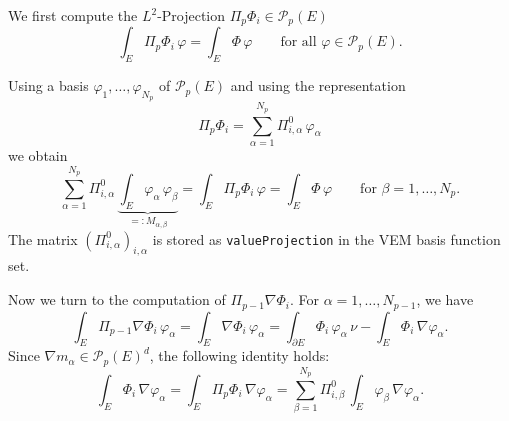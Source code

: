\documentclass{article}
\begin{document}
We first compute the $L^2$-Projection $\Pi_p \Phi_i \in \mathcal{P}_p( E )$
\begin{equation*}
  \int_E \Pi_p \Phi_i\,\varphi = \int_E \Phi\,\varphi
  \qquad\text{for all $\varphi \in \mathcal{P}_p( E )$.}
\end{equation*}

Using a basis $\varphi_1, \ldots, \varphi_{N_p}$ of $\mathcal{P}_p( E )$ and using
the representation
\begin{equation*}
  \Pi_p \Phi_i = \sum_{\alpha=1}^{N_p} \Pi^0_{i,\alpha}\,\varphi_\alpha
\end{equation*}
we obtain
\begin{equation*}
  \sum_{\alpha=1}^{N_p} \Pi^0_{i, \alpha}\,\underbrace{\int_E \varphi_\alpha\,\varphi_\beta}_{=: M_{\alpha,\beta}}
  = \int_E \Pi_p \Phi_i\,\varphi
  = \int_E \Phi\,\varphi
  \qquad\text{for $\beta = 1, \ldots, N_p$.}
\end{equation*}
The matrix $(\Pi^0_{i, \alpha})_{i, \alpha}$ is stored as \texttt{valueProjection}
in the VEM basis function set.


Now we turn to the computation of $\Pi_{p-1} \nabla \Phi_i$.
For $\alpha = 1, \ldots, N_{p-1}$, we have
\begin{equation*}
  \int_E \Pi_{p-1} \nabla \Phi_i\,\varphi_\alpha
    = \int_E \nabla \Phi_i\,\varphi_\alpha
    = \int_{\partial E} \Phi_i\,\varphi_\alpha\,\nu - \int_E \Phi_i\,\nabla \varphi_\alpha.
\end{equation*}
Since $\nabla m_\alpha \in \mathcal{P}_p( E )^d$, the following identity holds:
\begin{equation*}
  \int_E \Phi_i\,\nabla \varphi_\alpha
    = \int_E \Pi_p \Phi_i\,\nabla \varphi_\alpha
    = \sum_{\beta=1}^{N_p} \Pi^0_{i, \beta}\,\int_E \varphi_\beta\,\nabla \varphi_\alpha.
\end{equation*}
\end{document}
